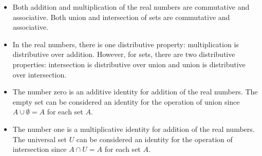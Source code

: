\documentclass[11pt]{article}
\begin{document}
\begin{itemize}
\item Both addition and multiplication of the real numbers are commutative and associative.  Both union and intersection of sets are commutative and associative.

\item In the real numbers, there is one distributive property:  multiplication is distributive over addition.  However, for sets, there are two distributive properties:  intersection is distributive over union and union is distributive over intersection.

\item The number zero is an additive identity for addition of the real numbers.  The empty set can be considered an identity for the operation of union since  $A \cup \emptyset  = A$ 
for each set  $A$.

\item The number one is a multiplicative identity for addition of the real numbers.  The universal set  $U$  can be considered an identity for the operation of intersection since  $A \cap U = A$
for each set  $A$.
\end{itemize}
\end{document}
